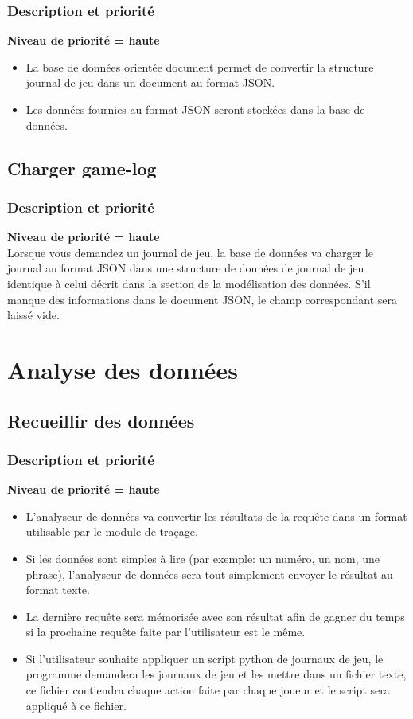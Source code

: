 \documentclass{scrreprt}
\begin{document}
\subsubsection{Description et priorité}
\textbf{Niveau de priorité = haute}\\
\begin{itemize}
\item La base de données orientée document permet de convertir la structure journal de jeu dans un document au format JSON.
\item Les données fournies au format JSON seront stockées dans la base de données.
\end{itemize}

\subsection{Charger game-log}
\subsubsection{Description et priorité}
\textbf{Niveau de priorité = haute}\\
Lorsque vous demandez un journal de jeu, la base de données va charger le journal au format JSON dans une structure de données de journal de jeu identique à celui décrit dans la section de la modélisation des données.
S'il manque des informations dans le document JSON, le champ correspondant sera laissé vide.

\section{Analyse des données}
\subsection{Recueillir des données}
\subsubsection{Description et priorité}
\textbf{Niveau de priorité = haute}\\
\begin{itemize}

\item L'analyseur de données va convertir les résultats de la requête dans un format utilisable par le module de traçage.
\item Si les données sont simples à lire (par exemple: un numéro, un nom, une phrase), l'analyseur de données sera tout simplement envoyer le résultat au format texte.
\item La dernière requête sera mémorisée avec son résultat afin de gagner du temps si la prochaine requête faite par l'utilisateur est le même.
\item Si l'utilisateur souhaite appliquer un script python de journaux de jeu, le programme demandera les journaux de jeu et les mettre dans un fichier texte, ce fichier contiendra chaque action faite par chaque joueur et le script sera appliqué à ce fichier.
\end{itemize}
\end{document}
